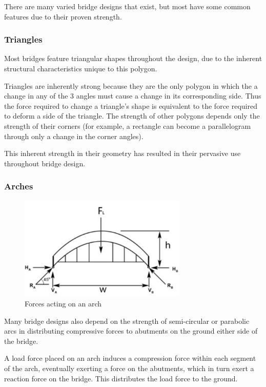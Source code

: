 \documentclass[a4paper,11pt]{article}
\begin{document}
There are many varied bridge designs that exist, but most have some common
features due to their proven strength.


\subsubsection{Triangles}

Most bridges feature triangular shapes throughout the design, due to the
inherent structural characteristics unique to this polygon.

Triangles are inherently strong because they are the only polygon in which the
a change in any of the 3 angles must cause a change in its corresponding side.
Thus the force required to change a triangle's shape is equivalent to the force
required to deform a side of the triangle.
The strength of other polygons depends only the strength of their corners (for
example, a rectangle can become a parallelogram through only a change in the
corner angles).

This inherent strength in their geometry has resulted in their pervasive use
throughout bridge design.


\subsubsection{Arches}

\begin{figure}
\begin{center}
\includegraphics[width=8cm]{figures/arch.png}
\end{center}
\caption{Forces acting on an arch}
\label{research:arch}
\end{figure}

Many bridge designs also depend on the strength of semi-circular or parabolic
arcs in distributing compressive forces to abutments on the ground either side
of the bridge.

A load force placed on an arch induces a compression force within each segment
of the arch, eventually exerting a force on the abutments, which in turn exert
a reaction force on the bridge.
This distributes the load force to the ground.
\end{document}
